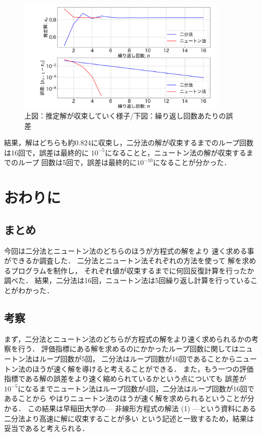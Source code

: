 \documentclass[uplatex]{jsarticle}
\begin{document}
\begin{figure}[H]
    \centering
    \includegraphics[width=0.9\textwidth]{class_technical_report-main_shiozawaChange/Figure_kekka.png}
    \caption{上図：推定解が収束していく様子/下図：繰り返し回数あたりの誤差}
    \label{fig:kekka}
\end{figure}

結果，解はどちらも約$0.824$に収束し，二分法の解が収束するまでのループ回数は16回で，誤差は最終的に
$10^{-5}$になることと，ニュートン法の解が収束するまでのループ
回数は5回で，誤差は最終的に$10^{-10}$になることが分かった．

\section{おわりに}

\subsection{まとめ}
今回は二分法とニュートン法のどちらのほうが方程式の解をより
速く求める事ができるか調査した．
二分法とニュートン法それぞれの方法を使って
解を求めるプログラムを制作し，
それぞれ値が収束するまでに何回反復計算を行ったか調べた．
結果，二分法は16回，ニュートン法は5回繰り返し計算を行っていることがわかった．

\subsection{考察}

まず，二分法とニュートン法のどちらが方程式の解をより速く求められるかの考察を行う．
評価指標にある解を求めるのにかかったループ回数に関してはニュートン法はループ回数が5回，
二分法はループ回数が16回であることからニュートン法のほうが速く解を導けると考えることができる．
また，もう一つの評価指標である解の誤差をより速く縮められているかという点についても
誤差が$10^{-5}$になるまでニュートン法はループ回数が4回，二分法はループ回数が16回であることから
やはりニュートン法のほうが速く解を求められるということが分かる．
この結果は早稲田大学の— 非線形方程式の解法 (1) —\cite{waseda}という資料にある二分法より高速に解に収束することが多い
という記述と一致するため，結果は妥当であると考えられる．
\end{document}

